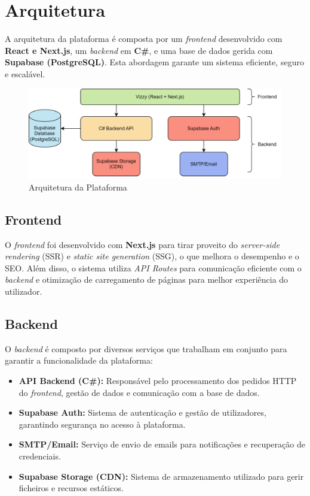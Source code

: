 \documentclass[a4paper, 12pt]{article} %
\begin{document}

\newpage

\section{Arquitetura}
A arquitetura da plataforma é composta por um \textit{frontend} desenvolvido com \textbf{React e Next.js}, um \textit{backend} em \textbf{C\#}, e uma base de dados gerida com \textbf{Supabase (PostgreSQL)}. Esta abordagem garante um sistema eficiente, seguro e escalável.

\begin{figure}[ht]
	\centering
	\includegraphics[width=\textwidth]{../images/system-architecture.png}
	\caption{Arquitetura da Plataforma}
	\label{fig:arquitetura}
\end{figure}

\subsection{Frontend}
O \textit{frontend} foi desenvolvido com \textbf{Next.js} para tirar proveito do \textit{server-side rendering} (SSR) e \textit{static site generation} (SSG), o que melhora o desempenho e o SEO. Além disso, o sistema utiliza \textit{API Routes} para comunicação eficiente com o \textit{backend} e otimização de carregamento de páginas para melhor experiência do utilizador.

\subsection{Backend}
O \textit{backend} é composto por diversos serviços que trabalham em conjunto para garantir a funcionalidade da plataforma:

\begin{itemize}
	\item \textbf{API Backend (C\#):} Responsável pelo processamento dos pedidos HTTP do \textit{frontend}, gestão de dados e comunicação com a base de dados.
	\item \textbf{Supabase Auth:} Sistema de autenticação e gestão de utilizadores, garantindo segurança no acesso à plataforma.
	\item \textbf{SMTP/Email:} Serviço de envio de emails para notificações e recuperação de credenciais.
	\item \textbf{Supabase Storage (CDN):} Sistema de armazenamento utilizado para gerir ficheiros e recursos estáticos.
\end{itemize}
\end{document}
